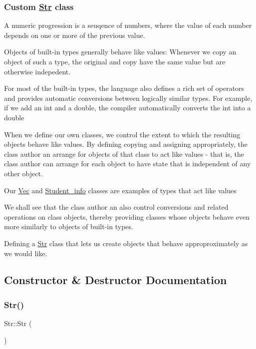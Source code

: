  \subsubsection*{Custom \hyperlink{classStr}{Str} class }

A numeric progression is a seuqence of numbers, where the value of each number depends on one or more of the previous value.

Objects of built-\/in types generally behave like values\+: Whenever we copy an object of such a type, the original and copy have the same value but are otherwise indepedent.

For most of the built-\/in types, the language also defines a rich set of operators and provides automatic conversions between logically similar types. For example, if we add an int and a double, the compiler automatically converts the int into a double

When we define our own classes, we control the extent to which the resulting objects behave like values. By defining copying and assigning appropriately, the class author an arrange for objects of that class to act like values -\/ that is, the class author can arrange for each object to have state that is independent of any other object.

Our \hyperlink{classVec}{Vec} and \hyperlink{classStudent__info}{Student\+\_\+info} classes are examples of types that act like values

We shall see that the class author an also control conversions and related operations on class objects, thereby providing classes whose objects behave even more similarly to objects of built-\/in types.

Defining a \hyperlink{classStr}{Str} class that lets us create objects that behave approproximately as we would like. 

\subsection{Constructor \& Destructor Documentation}
\mbox{\label{classStr_a51d07a34edbcb6ab60c23c0a1f6d2625}} 
\subsubsection{\texorpdfstring{Str()}{Str()}\hspace{0.1cm}{\footnotesize\ttfamily [1/3]}}
{\footnotesize\ttfamily Str\+::\+Str (\begin{DoxyParamCaption}{ }\end{DoxyParamCaption})\hspace{0.3cm}{\ttfamily [inline]}}

